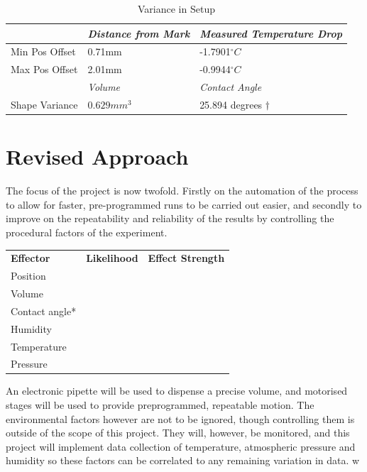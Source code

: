 \begin{table}[h]
    \centering
    \begin{tabular}{|l|l|l|}
    \hline
                   & \textit{Distance from Mark}          & \textit{Measured Temperature Drop} \\ \hline
    Min Pos Offset & 0.71mm                     &-1.7901$^{\circ}C$    \\ \hline
    Max Pos Offset &       2.01mm    &  -0.9944$^{\circ}C$    \\ \hline
                   & \textit{Volume}            & \textit{Contact Angle}          \\ \hline
    Shape Variance & $0.629mm^3$ & 25.894 degrees $\dagger$                \\ \hline
    \end{tabular}
    \caption{Variance in Setup}
    \end{table}


\section{Revised Approach}
The focus of the project is now twofold. Firstly on the automation of the process to allow for faster, pre-programmed runs to be carried out easier, and secondly to improve on the repeatability and reliability of the results by controlling the procedural factors of the experiment. 

\begin{table}[h]
    \begin{tabular}{lll}
    \textbf{Effector} & \textbf{Likelihood} & \textbf{Effect Strength} \\
    Position          &                    &                          \\
    Volume            &                    &                          \\
    Contact angle*    &                    &                          \\
    Humidity          &                    &                          \\
    Temperature       &                    &                          \\
    Pressure          &                    &                         
    \end{tabular}
    \end{table}

An electronic pipette will be used to dispense a precise volume, and motorised stages will be used to provide preprogrammed, repeatable motion. The environmental factors however are not to be ignored, though controlling them is outside of the scope of this project. They will, however, be monitored, and this project will implement data collection of temperature, atmospheric pressure and humidity so these factors can be correlated to any remaining variation in data.  w